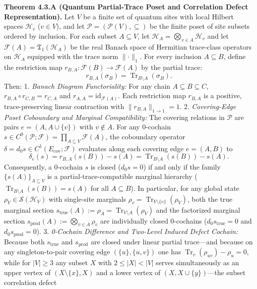\documentclass[
  11pt,
]{article}
\begin{document}
\textbf{Theorem 4.3.A (Quantum Partial-Trace Poset and Correlation Defect Representation).} Let \(V\) be a finite set of quantum sites with local Hilbert spaces \(\mathcal{H}_v\) (\(v\in V\)), and let \(\mathcal{P} = (\mathcal{P}(V), \subseteq)\) be the finite poset of site subsets ordered by inclusion.
For each subset \(A \subseteq V\), let \(\mathcal{H}_A = \bigotimes_{v\in A} \mathcal{H}_v\) and let \(\mathcal{F}(A) = \mathfrak{T}_1(\mathcal{H}_A)\) be the real Banach space of Hermitian trace-class operators on \(\mathcal{H}_A\) equipped with the trace norm \(\lVert\cdot\rVert_1\).
For every inclusion \(A \subseteq B\), define the restriction map \(r_{B,A}: \mathcal{F}(B) \to \mathcal{F}(A)\) by the partial trace:
\[
r_{B,A}(\sigma_B) = \operatorname{Tr}_{B\setminus A}(\sigma_B).
\]
Then:
1. \emph{Banach Diagram Functoriality:} For any chain \(A \subseteq B \subseteq C\), \(r_{B,A} \circ r_{C,B} = r_{C,A}\) and \(r_{A,A} = \mathrm{id}_{\mathcal{F}(A)}\). Each restriction map \(r_{B,A}\) is a positive, trace-preserving linear contraction with \(\lVert r_{B,A}\rVert_{1\to 1} = 1\).
2. \emph{Covering-Edge Poset Coboundary and Marginal Compatibility:} The covering relations in \(\mathcal{P}\) are pairs \(e = (A, A \cup \{v\})\) with \(v \notin A\). For any 0-cochain \(s \in C^0(\mathcal{P}; \mathcal{F}) = \prod_{A\subseteq V} \mathcal{F}(A)\), the coboundary operator \(\delta = d_0 s \in C^1(E_{\mathrm{cov}}; \mathcal{F})\) evaluates along each covering edge \(e = (A, B)\) to
\[
\delta_e(s) = r_{B,A}(s(B)) - s(A) = \operatorname{Tr}_{B\setminus A}(s(B)) - s(A).
\]
Consequently, a 0-cochain \(s\) is closed (\(d_0 s = 0\)) if and only if the family \(\{s(A)\}_{A\subseteq V}\) is a partial-trace-compatible marginal hierarchy (\(\operatorname{Tr}_{B\setminus A}(s(B)) = s(A)\) for all \(A \subseteq B\)). In particular, for any global state \(\rho_V \in \mathcal{S}(\mathcal{H}_V)\) with single-site marginals \(\rho_v = \operatorname{Tr}_{V\setminus\{v\}}(\rho_V)\), both the true marginal section \(s_{\mathrm{true}}(A) := \rho_A = \operatorname{Tr}_{V\setminus A}(\rho_V)\) and the factorized marginal section \(s_{\mathrm{prod}}(A) := \bigotimes_{v\in A} \rho_v\) are individually closed 0-cochains (\(d_0 s_{\mathrm{true}} = 0\) and \(d_0 s_{\mathrm{prod}} = 0\)).
3. \emph{0-Cochain Difference and Two-Level Induced Defect Cochain:} Because both \(s_{\mathrm{true}}\) and \(s_{\mathrm{prod}}\) are closed under linear partial trace---and because on any singleton-to-pair covering edge \((\{u\},\{u,v\})\) one has \(\operatorname{Tr}_v(\rho_{uv}) - \rho_u = 0\), while for \(|V|\ge 3\) any subset \(X\) with \(2\le |X| < |V|\) serves simultaneously as an upper vertex of \((X\setminus\{x\}, X)\) and a lower vertex of \((X, X\cup\{y\})\)---the subset correlation defect
\end{document}
